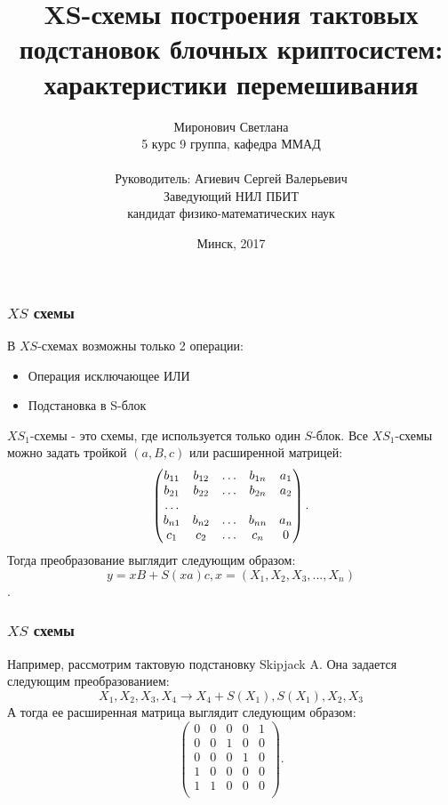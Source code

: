 \documentclass{beamer}
\title[XS-схемы] %
{XS-схемы построения тактовых подстановок блочных криптосистем: характеристики перемешивания}
\author[Миронович С.] %
{Миронович Светлана\\ 5 курс 9 группа, кафедра ММАД\\~ \\Руководитель: Агиевич Сергей Валерьевич \\ Заведующий НИЛ ПБИТ\\ кандидат физико-математических наук}
\institute[БГУ] %
{
  Белорусский государственный университет\\
  Факультет прикладной математики и информатики
}
\date[2017] %
{Минск, 2017}
\begin{document}
\frame{\titlepage}

  \begin{frame}
    \frametitle{$XS$ схемы}
В $XS$-схемах возможны только 2 операции:
\begin{itemize}
\item Операция исключающее ИЛИ
\item Подстановка в S-блок
\end{itemize}
$XS_1$-схемы - это схемы, где используется только один $S$-блок.
Все $XS_1$-схемы можно задать тройкой $(a, B, c)$ или расширенной матрицей:
$$
\begin{pmatrix}
b_{11} & b_{12} & \ldots & b_{1n} & a_1\\
b_{21} & b_{22} & \ldots & b_{2n} & a_2\\
\dotfill\\
b_{n1} & b_{n2} & \ldots & b_{nn} & a_n\\
c_1    & c_2    & \ldots & c_n    & 0\\
\end{pmatrix}.
$$
Тогда преобразование выглядит следующим образом:
$$y = xB + S(xa)c, x = (X_1, X_2, X_3, ..., X_n)$$.
  \end{frame}
 \begin{frame}
    \frametitle{$XS$ схемы}
Например, рассмотрим тактовую подстановку Skipjack A. Она задается следующим преобразованием:
$$X_1, X_2, X_3, X_4 \rightarrow X_4+S(X_1), S(X_1), X_2, X_3$$
А тогда ее расширенная матрица выглядит следующим образом:
$$
\begin{pmatrix}
0 & 0 & 0 & 0 & 1\\
0 & 0 & 1 & 0 & 0\\
0 & 0 & 0 & 1 & 0\\
1 & 0 & 0 & 0 & 0\\
1    & 1    & 0 & 0    & 0\\
\end{pmatrix}.
$$
  \end{frame}
\end{document}
